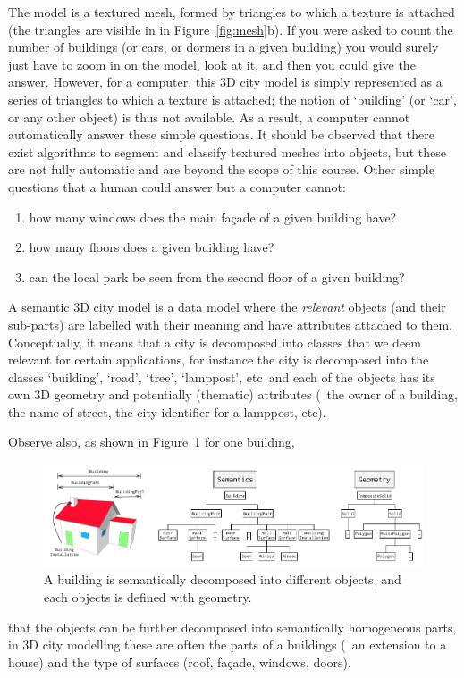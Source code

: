 The model is a textured mesh, formed by triangles to which a texture is attached (the triangles are visible in in Figure~\ref{fig:mesh}b).
If you were asked to count the number of buildings (or cars, or dormers in a given building) you would surely just have to zoom in on the model, look at it, and then you could give the answer.
However, for a computer, this 3D city model is simply represented as a series of triangles to which a texture is attached; the notion of `building' (or `car', or any other object) is thus not available.
As a result, a computer cannot automatically answer these simple questions.
It should be observed that there exist algorithms to segment and classify textured meshes into objects, but these are not fully automatic and are beyond the scope of this course.
Other simple questions that a human could answer but a computer cannot:
\begin{enumerate}
  \item how many windows does the main façade of a given building have?
  \item how many floors does a given building have?
  \item can the local park be seen from the second floor of a given building?
\end{enumerate}

%

A semantic 3D city model is a data model where the \emph{relevant} objects (and their sub-parts) are labelled with their meaning and have attributes attached to them.
Conceptually, it means that a city is decomposed into classes that we deem relevant for certain applications, for instance the city is decomposed into the classes `building', `road', `tree', `lamppost', etc\ and each of the objects has its own 3D geometry and potentially (thematic) attributes (\eg\ the owner of a building, the name of street, the city identifier for a lamppost, etc).

%

Observe also, as shown in Figure~\ref{fig:ssc} for one building, 
\begin{figure}
  \centering
  \includegraphics[width=0.95\linewidth]{figs/ssc}
  \caption{A building is semantically decomposed into different objects, and each objects is defined with geometry.}%
\label{fig:ssc}
\end{figure}
that the objects can be further decomposed into semantically homogeneous parts, in 3D city modelling these are often the parts of a buildings (\eg\ an extension to a house) and the type of surfaces (roof, façade, windows, doors).

